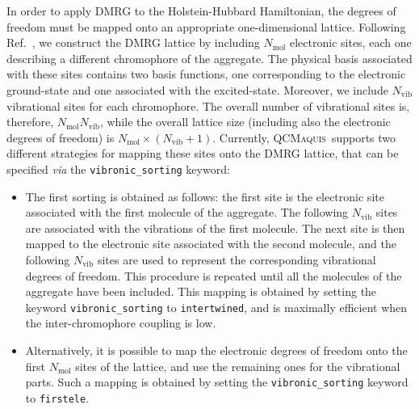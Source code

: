 \documentclass[bibliography=totoc,12pt,a4paper]{scrartcl}
\newcommand{\qcm}{\textsc{QCMaquis}}
\begin{document}
In order to apply DMRG to the Holstein-Hubbard Hamiltonian, the degrees of freedom must be mapped onto an appropriate one-dimensional lattice.
Following Ref.~, we construct the DMRG lattice by including $N_\text{mol}$ electronic sites, each one describing a different chromophore of the aggregate.
The physical basis associated with these sites contains two basis functions, one corresponding to the electronic ground-state and one associated with the excited-state.
Moreover, we include $N_\text{vib}$ vibrational sites for each chromophore.
The overall number of vibrational sites is, therefore, $N_\text{mol} N_\text{vib}$, while the overall lattice size (including also the electronic degrees of freedom) is $N_\text{mol} \times (N_\text{vib}+1)$.
Currently, \qcm\ supports two different strategies for mapping these sites onto the DMRG lattice, that can be specified \textit{via} the \texttt{vibronic\_sorting} keyword:

\begin{itemize}
  \item The first sorting is obtained as follows: the first site is the electronic site associated with the first molecule of the aggregate. The following $N_\text{vib}$ sites are associated with the vibrations of the first molecule. The next site is then mapped to the electronic site associated with the second molecule, and the following $N_\text{vib}$ sites are used to represent the corresponding vibrational degrees of freedom. This procedure is repeated until all the molecules of the aggregate have been included. This mapping is obtained by setting the keyword \texttt{vibronic\_sorting} to \texttt{intertwined}, and is maximally efficient when the inter-chromophore coupling is low.
  \item Alternatively, it is possible to map the electronic degrees of freedom onto the first $N_\text{mol}$ sites of the lattice, and use the remaining ones for the vibrational parts.
  Such a mapping is obtained by setting the \texttt{vibronic\_sorting} keyword to \texttt{firstele}.
\end{itemize}
\end{document}
